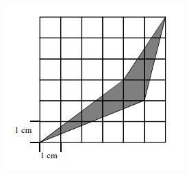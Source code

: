\documentclass[12pt]{article}
\begin{document}
\begin{enumerate}[topsep=2\bigskipamount,itemsep=\bigskipamount]
\begin{multicols}{2}
\centering
\includegraphics[width=0.8\linewidth]{boomerang.png}
\end{multicols}

\end{enumerate}
\end{document}
